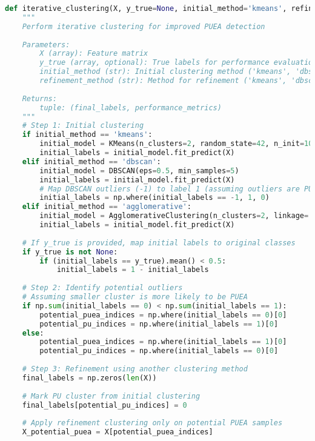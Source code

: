 \begin{lstlisting}[language=Python, caption=Iterative Clustering Implementation]
def iterative_clustering(X, y_true=None, initial_method='kmeans', refinement_method='dbscan'):
    """
    Perform iterative clustering for improved PUEA detection
    
    Parameters:
        X (array): Feature matrix
        y_true (array, optional): True labels for performance evaluation
        initial_method (str): Initial clustering method ('kmeans', 'dbscan', or 'agglomerative')
        refinement_method (str): Method for refinement ('kmeans', 'dbscan', or 'agglomerative')
    
    Returns:
        tuple: (final_labels, performance_metrics)
    """
    # Step 1: Initial clustering
    if initial_method == 'kmeans':
        initial_model = KMeans(n_clusters=2, random_state=42, n_init=10)
        initial_labels = initial_model.fit_predict(X)
    elif initial_method == 'dbscan':
        initial_model = DBSCAN(eps=0.5, min_samples=5)
        initial_labels = initial_model.fit_predict(X)
        # Map DBSCAN outliers (-1) to label 1 (assuming outliers are PUEAs)
        initial_labels = np.where(initial_labels == -1, 1, 0)
    elif initial_method == 'agglomerative':
        initial_model = AgglomerativeClustering(n_clusters=2, linkage='ward')
        initial_labels = initial_model.fit_predict(X)
    
    # If y_true is provided, map initial labels to original classes
    if y_true is not None:
        if (initial_labels == y_true).mean() < 0.5:
            initial_labels = 1 - initial_labels
    
    # Step 2: Identify potential outliers
    # Assuming smaller cluster is more likely to be PUEA
    if np.sum(initial_labels == 0) < np.sum(initial_labels == 1):
        potential_puea_indices = np.where(initial_labels == 0)[0]
        potential_pu_indices = np.where(initial_labels == 1)[0]
    else:
        potential_puea_indices = np.where(initial_labels == 1)[0]
        potential_pu_indices = np.where(initial_labels == 0)[0]
    
    # Step 3: Refinement using another clustering method
    final_labels = np.zeros(len(X))
    
    # Mark PU cluster from initial clustering
    final_labels[potential_pu_indices] = 0
    
    # Apply refinement clustering only on potential PUEA samples
    X_potential_puea = X[potential_puea_indices]
    

\end{lstlisting}
